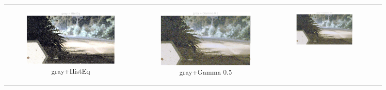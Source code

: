 \documentclass[11pt, a4]{article}
\begin{document}
\begin{enumerate}
\begin{enumerate}
\begin{figure}[h]
{\begin{tabular}{cccc}
\begin{subfigure}[h]{0.45\linewidth}
							\centering
							\includegraphics[width=\linewidth]{../output/RawImage3_Tone_gray_HistEq.pdf}
							\caption{gray+HistEq}
							\label{fig:RawImage3_tone_1}
						\end{subfigure} &
						\begin{subfigure}[h]{0.45\linewidth}
							\centering
							\includegraphics[width=\linewidth]{../output/RawImage3_Tone_gray_Gamma0.5.pdf}
							\caption{gray+Gamma 0.5}
							\label{fig:RawImage3_tone_2}
						\end{subfigure} &
						\begin{subfigure}[h]{0.45\linewidth}
							\centering
							\includegraphics[width=\linewidth]{../output/RawImage3_Tone_gray_Gamma0.5.pdf}

\end{subfigure}
\end{tabular}}
\end{figure}
\end{enumerate}
\end{enumerate}
\end{document}
